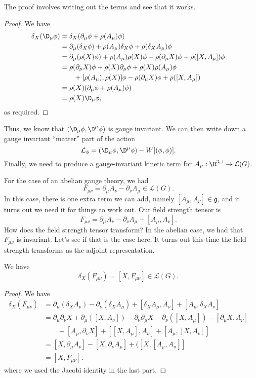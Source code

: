 \documentclass[a4paper]{article}
\begin{document}
The proof involves writing out the terms and see that it works.
\begin{proof}
  We have
  \begin{align*}
    \delta_X (\D_\mu \phi) &= \delta_X(\partial_\mu \phi + \rho(A_\mu) \phi)\\
    &= \partial_\mu (\delta_X\phi) + \rho(A_\mu) \delta_X \phi + \rho(\delta_X A_\mu)\phi\\
    &= \partial_\mu (\rho(X) \phi) + \rho(A_\mu) \rho(X) \phi - \rho(\partial_\mu X) \phi + \rho([X, A_\mu]) \phi\\
    &= \rho(\partial_\mu X) \phi + \rho(X) \partial_\mu \phi + \rho(X)\rho(A_\mu) \phi \\
    &\quad\quad+ [\rho(A_\mu), \rho(X)] \phi - \rho(\partial_\mu X) \phi + \rho([X, A_\mu])\\
    &= \rho(X)(\partial_\mu \phi + \rho(A_\mu) \phi)\\
    &= \rho(X) \D_\mu \phi,
  \end{align*}
  as required.
\end{proof}

Thus, we know that $(\D_\mu \phi, \D^\mu \phi)$ is gauge invariant. We can then write down a gauge invariant ``matter'' part of the action
\[
  \mathcal{L}_\phi = (\D_\mu \phi, \D^\mu \phi) - W[(\phi, \phi)].
\]
Finally, we need to produce a gauge-invariant kinetic term for $A_\mu: \R^{3, 1} \to \mathcal{L}(G)$.

For the case of an abelian gauge theory, we had
\[
  F_{\mu\nu} = \partial_\mu A_\nu - \partial_\nu A_\mu \in \mathcal{L}(G).
\]
In this case, there is one extra term we can add, namely $[A_\mu, A_\nu] \in \mathfrak{g}$, and it turns out we need it for things to work out. Our field strength tensor is
\[
  F_{\mu\nu} = \partial_\mu A_\nu - \partial_\nu A_\mu + [A_\mu, A_\nu].
\]
How does the field strength tensor transform? In the abelian case, we had that $F_{\mu\nu}$ is invariant. Let's see if that is the case here. It turns out this time the field strength transforms as the adjoint representation.
\begin{lemma}
  We have
  \[
    \delta_X (F_{\mu\nu}) = [X, F_{\mu\nu}] \in \mathcal{L}(G).
  \]
\end{lemma}

\begin{proof}
  We have
  \begin{align*}
    \delta_X(F_{\mu\nu}) &= \partial_\mu (\delta_X A_\nu) - \partial_\nu (\delta_X A_\mu) + [\delta_X A_\mu, A_\nu] + [A_\mu, \delta_X A_\nu]\\
    &= \partial_\mu \partial_\nu X + \partial_\mu ([X, A_\nu]) - \partial_\nu \partial_\mu X - \partial_\nu ([X, A_\mu]) - [\partial_\mu X, A_\nu]\\
    &\quad\quad- [A_\mu, \partial_\nu X] + [[X, A_\mu ], A_\nu] + [A_\mu, [X, A_\nu]]\\
    &= [X, \partial_\mu A_\nu] - [X, \partial_\nu A_\mu] +([X, [A_\mu, A_n]]\\
    &= [X, F_{\mu\nu}].
  \end{align*}
  where we used the Jacobi identity in the last part.
\end{proof}
\end{document}
